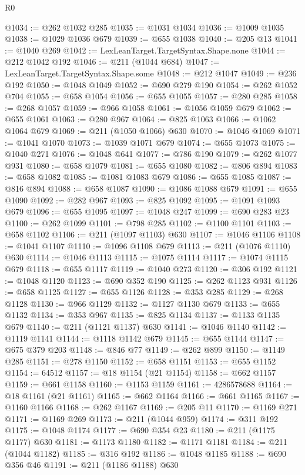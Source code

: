 \begin{lexlean}{R0}
\begin{coremodule}
@1034 := @262 @1032 @285
@1035 := @1031 @1034
@1036 := @1009 @1035
@1038 := @1029 @1036 @679
@1039 := @655 @1038
@1040 := @205 @13
@1041 := @1040 @269
@1042 := LexLeanTarget.TargetSyntax.Shape.none
@1044 := @212 @1042 @192
@1046 := @211 (@1044 @684)
@1047 := LexLeanTarget.TargetSyntax.Shape.some
@1048 := @212 @1047
@1049 := @236 @192
@1050 := @1048 @1049
@1052 := @690 @279 @190
@1054 := @262 @1052 @704
@1055 := @658 @1054
@1056 := @655 @1055
@1057 := @280 @285
@1058 := @268 @1057
@1059 := @966 @1058
@1061 := @1056 @1059 @679
@1062 := @655 @1061
@1063 := @280 @967
@1064 := @825 @1063
@1066 := @1062 @1064 @679
@1069 := @211 (@1050 @1066) @630
@1070 := @1046 @1069
@1071 := @1041 @1070
@1073 := @1039 @1071 @679
@1074 := @655 @1073
@1075 := @1040 @271
@1076 := @1048 @641
@1077 := @786 @190
@1079 := @262 @1077 @931
@1080 := @658 @1079
@1081 := @655 @1080
@1082 := @806 @894
@1083 := @658 @1082
@1085 := @1081 @1083 @679
@1086 := @655 @1085
@1087 := @816 @894
@1088 := @658 @1087
@1090 := @1086 @1088 @679
@1091 := @655 @1090
@1092 := @282 @967
@1093 := @825 @1092
@1095 := @1091 @1093 @679
@1096 := @655 @1095
@1097 := @1048 @247
@1099 := @690 @283 @23
@1100 := @262 @1099
@1101 := @798 @285
@1102 := @1100 @1101
@1103 := @658 @1102
@1106 := @211 (@1097 @1103) @630
@1107 := @1046 @1106
@1108 := @1041 @1107
@1110 := @1096 @1108 @679
@1113 := @211 (@1076 @1110) @630
@1114 := @1046 @1113
@1115 := @1075 @1114
@1117 := @1074 @1115 @679
@1118 := @655 @1117
@1119 := @1040 @273
@1120 := @306 @192
@1121 := @1048 @1120
@1123 := @690 @352 @190
@1125 := @262 @1123 @931
@1126 := @658 @1125
@1127 := @655 @1126
@1128 := @353 @285
@1129 := @268 @1128
@1130 := @966 @1129
@1132 := @1127 @1130 @679
@1133 := @655 @1132
@1134 := @353 @967
@1135 := @825 @1134
@1137 := @1133 @1135 @679
@1140 := @211 (@1121 @1137) @630
@1141 := @1046 @1140
@1142 := @1119 @1141
@1144 := @1118 @1142 @679
@1145 := @655 @1144
@1147 := @675 @379 @203
@1148 := @846 @77
@1149 := @262 @899
@1150 := @1149 @285
@1151 := @278 @1150
@1152 := @658 @1151
@1153 := @655 @1152
@1154 := 64512
@1157 := @18 @1154 (@21 @1154)
@1158 := @662 @1157
@1159 := @661 @1158
@1160 := @1153 @1159
@1161 := 4286578688
@1164 := @18 @1161 (@21 @1161)
@1165 := @662 @1164
@1166 := @661 @1165
@1167 := @1160 @1166
@1168 := @262 @1167
@1169 := @205 @11
@1170 := @1169 @271
@1171 := @1169 @269
@1173 := @211 (@1044 @959)
@1174 := @311 @192
@1175 := @1048 @1174
@1177 := @690 @354 @23
@1180 := @211 (@1175 @1177) @630
@1181 := @1173 @1180
@1182 := @1171 @1181
@1184 := @211 (@1044 @1182)
@1185 := @316 @192
@1186 := @1048 @1185
@1188 := @690 @356 @46
@1191 := @211 (@1186 @1188) @630

\end{coremodule}
\end{lexlean}

